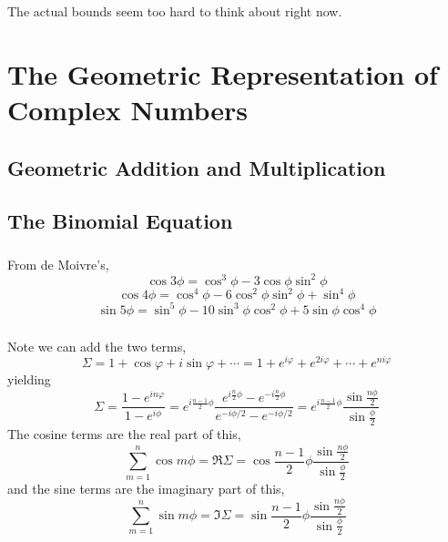 The actual bounds seem too hard to think about right now.
\section{The Geometric Representation of Complex Numbers}
\subsection{Geometric Addition and Multiplication}
\subsubsection{}
\subsubsection{}
\subsubsection{}
\subsubsection{}
\subsection{The Binomial Equation}
\subsubsection{}
From de Moivre's,
\[\cos3\phi = \cos^3\phi - 3\cos\phi\sin^2\phi\]
\[\cos4\phi = \cos^4\phi - 6\cos^2\phi\sin^2\phi+\sin^4\phi\]
\[\sin5\phi = \sin^5\phi-10\sin^3\phi\cos^2\phi+5\sin\phi\cos^4\phi\]
\subsubsection{}
Note we can add the two terms, 
\[\Sigma=1+\cos\varphi+i\sin\varphi+\cdots = 1+e^{i\varphi}+e^{2i\varphi}+\cdots+e^{ni\varphi}\]
yielding
\[\Sigma = \frac{1-e^{in\varphi}}{1-e^{i\phi}} = e^{i\frac{n-1}{2}\phi}\frac{e^{i\frac{n}{2}\phi}-e^{-i\frac{n}{2}\phi}}{e^{-i\phi/2}-e^{-i\phi/2}} = e^{i\frac{n-1}{2}\phi}\frac{\sin\frac{n\phi}{2}}{\sin\frac{\phi}{2}}\]
The cosine terms are the real part of this,
\[\sum_{m=1}^n\cos{m\phi} = \Re\Sigma = \cos\frac{n-1}{2}\phi\frac{\sin\frac{n\phi}{2}}{\sin\frac{\phi}{2}}\]
and the sine terms are the imaginary part of this,
\[\sum_{m=1}^n\sin{m\phi} = \Im\Sigma = \sin\frac{n-1}{2}\phi\frac{\sin\frac{n\phi}{2}}{\sin\frac{\phi}{2}}\]
